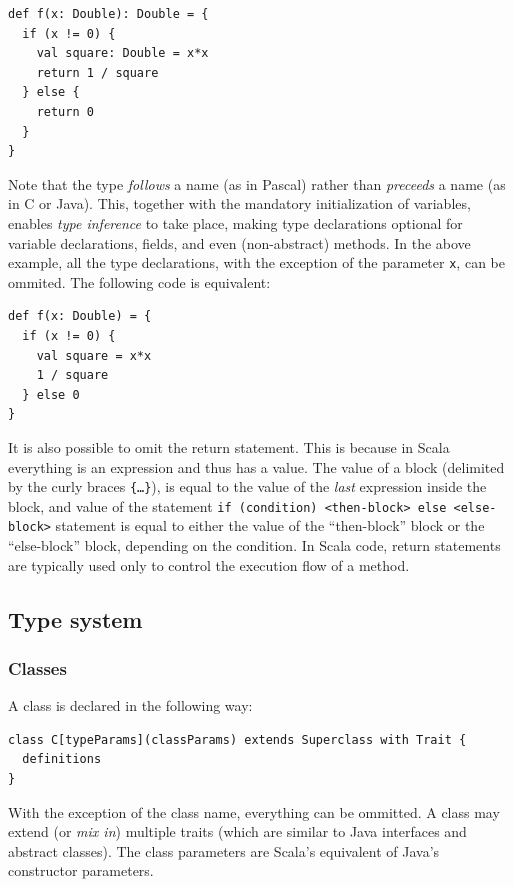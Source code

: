 \begin{lstlisting}
def f(x: Double): Double = {
  if (x != 0) {
    val square: Double = x*x
    return 1 / square 
  } else {
    return 0
  }
}
\end{lstlisting}

Note that the type \emph{follows} a name (as in Pascal) rather than \emph{preceeds} a name (as in C or Java). This, together with the mandatory initialization of variables, enables \emph{type inference} to take place, making type declarations optional for variable declarations, fields, and even (non-abstract) methods. In the above example, all the type declarations, with the exception of the parameter \texttt{x}, can be ommited. The following code is equivalent:
\begin{lstlisting}
def f(x: Double) = {
  if (x != 0) {
    val square = x*x
    1 / square 
  } else 0
}
\end{lstlisting}

It is also possible to omit the return statement. This is because in Scala everything is an expression and thus has a value. The value of a block (delimited by the curly braces \texttt{\{\dots\}}), is equal to the value of the \emph{last} expression inside the block, and value of the statement \texttt{if (condition) <then-block> else <else-block>} statement is equal to either the value of the ``then-block'' block or the ``else-block'' block, depending on the condition. In Scala code, return statements are typically used only to control the execution flow of a method.

\subsection{Type system}

\subsubsection{Classes}

A class is declared in the following way:

\begin{lstlisting}
class C[typeParams](classParams) extends Superclass with Trait {
  definitions
}
\end{lstlisting}

With the exception of the class name, everything can be ommitted. A class may extend (or \emph{mix in}) multiple traits (which are similar to Java interfaces and abstract classes). The class parameters are Scala's equivalent of Java's constructor parameters.

